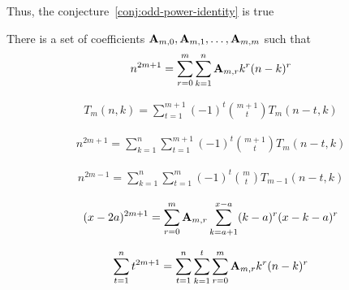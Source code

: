 ﻿Thus, the conjecture~\eqref{conj:odd-power-identity} is true

\begin{theorem}
    \label{theorem:odd-power-identity}
    There is a set of coefficients ${\mathbf{A}} \sb{m,0}, {\mathbf{A}} \sb{m,1}, \ldots, {\mathbf{A}} \sb{m,m}$ such that
    \begin{align*}
        n^{2m+1} = \sum_{r=0}^{m} \sum_{k=1}^{n} {\mathbf{A}} \sb{m,r} k^r (n-k)^r
    \end{align*}
\end{theorem}

\begin{proposition}
    \begin{align*}
        T_{m} (n, k) = \sum_{t=1}^{m+1} (-1)^t \binom{m+1}{t} T_{m} (n-t, k)
    \end{align*}
\end{proposition}

\begin{proposition}
    \begin{align*}
        n^{2m+1} = \sum_{k=1}^{n} \sum_{t=1}^{m+1} (-1)^t \binom{m+1}{t} T_{m} (n-t, k)
    \end{align*}
\end{proposition}

\begin{proposition}
    \begin{align*}
        n^{2m-1} = \sum_{k=1}^{n} \sum_{t=1}^{m} (-1)^t \binom{m}{t} T_{m-1} (n-t, k)
    \end{align*}
\end{proposition}

\begin{proposition}
    \begin{align*}
    (x-2a)
        ^{2m+1} = \sum_{r=0}^{m} {\mathbf{A}} \sb{m,r} \sum_{k=a+1}^{x-a} (k-a)^r (x-k-a)^r
    \end{align*}
\end{proposition}

\begin{proposition}
    \begin{align*}
        \sum_{t=1}^{n} t^{2m+1} = \sum_{t=1}^{n} \sum_{k=1}^{t} \sum_{r=0}^{m} {\mathbf{A}} \sb{m,r} k^r (n-k)^r
    \end{align*}
\end{proposition}
